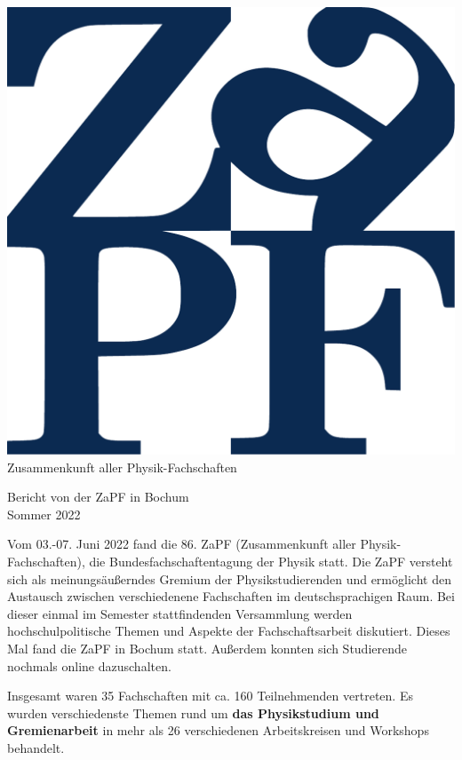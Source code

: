 \documentclass{scrartcl}
\begin{document}
\hspace{0.74\textwidth}
\begin{minipage}{0.25\textwidth}
      \vspace{-1cm}
      \centering
      \includegraphics[width=.89\textwidth]{../logo.pdf}
      \small Zusammenkunft aller Physik-Fachschaften
\end{minipage}

\begin{center}
      \vspace{1.5cm}
      \huge{Bericht von der ZaPF in Bochum \\ Sommer 2022}
      \vspace{1cm}
\end{center}

Vom 03.-07. Juni 2022 fand die 86. ZaPF (Zusammenkunft aller Physik-Fachschaften), die Bundesfachschaftentagung der Physik statt. Die ZaPF versteht sich als meinungsäußerndes Gremium der Physikstudierenden und ermöglicht den Austausch zwischen verschiedenene Fachschaften im deutschsprachigen Raum. Bei dieser einmal im Semester stattfindenden Versammlung werden hochschulpolitische Themen und Aspekte der Fachschaftsarbeit diskutiert. Dieses Mal fand die ZaPF in Bochum statt. Außerdem konnten sich Studierende nochmals online dazuschalten. 

Insgesamt waren 35 Fachschaften mit ca. 160 Teilnehmenden vertreten. Es wurden verschiedenste Themen rund um \textbf{das Physikstudium und Gremienarbeit} in mehr als 26 verschiedenen Arbeitskreisen und Workshops behandelt.
\end{document}
